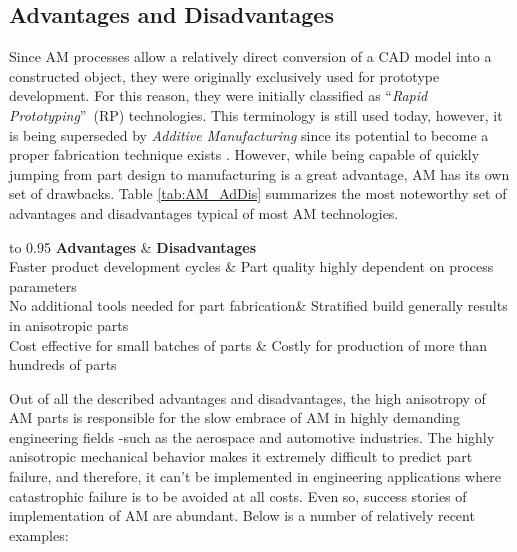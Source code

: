 \documentclass[main.tex]{subfiles}
\begin{document}
\subsection{Advantages and Disadvantages}\label{subsec:AMAdDis} 
Since AM processes allow a relatively direct conversion of a CAD model into a constructed object, they were originally exclusively used for prototype development. For this reason, they were initially classified as \textquotedblleft \emph{Rapid Prototyping}\textquotedblright~(RP) technologies. This terminology is still used today, however, it is being superseded by \emph{Additive Manufacturing} since its potential to become a proper fabrication technique exists \cite{Gibson2015}. However, while being capable of quickly jumping from part design to manufacturing is a great advantage, AM has its own set of drawbacks. Table \ref{tab:AM_AdDis} summarizes the most noteworthy set of advantages and disadvantages typical of most AM technologies.

\begin{table}[h]
	\centering
	\caption{Advantages and Disadvantages of Additive Manufacturing}
	\label{tab:AM_AdDis}
	\begin{tabu} to 0.95\textwidth {  X[c]  X[c] }
		\hline
		\textbf{Advantages} & \textbf{Disadvantages} \\ 
		\hline
		Faster product development cycles \cite{Gibson2015} & Part quality highly dependent on process parameters \cite{Gibson2015}\\
		No additional tools needed for part fabrication\cite{Gibson2015}&  Stratified build generally results in anisotropic parts \cite{Gibson2015, Capote2017}\\
		Cost effective for small batches of parts \cite{Baumers2016,Conner2014,Berman2012}&  Costly for production of more than hundreds of parts \cite{Baumers2016,Conner2014,Berman2012}\\
		\hline
	\end{tabu}
\end{table}   

Out of all the described advantages and disadvantages, the high anisotropy of AM parts is responsible for the slow embrace of AM in highly demanding engineering fields -such as the aerospace and automotive industries. The highly anisotropic mechanical behavior makes it extremely difficult to predict part failure, and therefore, it can't be implemented in engineering applications where catastrophic failure is to be avoided at all costs. Even so, success stories of implementation of AM are abundant. Below is a number of relatively recent examples:
\end{document}
